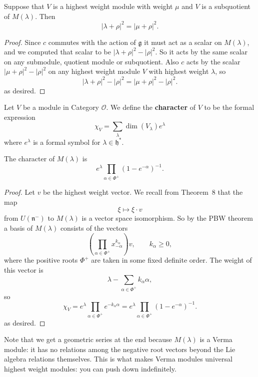 \documentclass[12pt]{article}
\begin{document}
\begin{proposition}
    Suppose that $V$ is a highest weight module with weight $\mu$ and $V$ is a subquotient of $M(\lambda)$. Then
    \[
        |\lambda + \rho|^2 = |\mu + \rho|^2.
    \]
\end{proposition}

\begin{proof}
    Since $c$ commutes with the action of $\mathfrak{g}$ it must act as a scalar on $M(\lambda)$, and we computed that scalar to be $|\lambda + \rho|^2 - |\rho|^2$. So it acts by the same scalar on any submodule, quotient module or subquotient. Also $c$ acts by the scalar $|\mu + \rho|^2 - |\rho|^2$ on any highest weight module $V$ with highest weight $\lambda$, so
    \[
        |\lambda + \rho|^2 - |\rho|^2 = |\mu + \rho|^2 - |\rho|^2.
    \] as desired.
\end{proof}

\begin{definition}
    Let $V$ be a module in Category $\mathcal{O}$. We define the \textbf{character} of $V$ to be the formal expression
    \[
        \chi_V = \sum_{\lambda} \dim(V_\lambda) e^\lambda
    \]
    where $e^\lambda$ is a formal symbol for $\lambda \in \mathfrak{h}^*$.
\end{definition}

\begin{proposition}\label{prop:char-verma}
    The character of $M(\lambda)$ is
    \[
        e^\lambda \prod_{\alpha \in \Phi^+} (1 - e^{-\alpha})^{-1}.
    \]
\end{proposition}

\begin{proof}
    Let $v$ be the highest weight vector. We recall from Theorem~8 that the map
    \[
        \xi \mapsto \xi \cdot v
    \]
    from $U(\mathfrak{n}^-)$ to $M(\lambda)$ is a vector space isomorphism. So by the PBW theorem a basis of $M(\lambda)$ consists of the vectors
    \[
        \left( \prod_{\alpha \in \Phi^+} x_{-\alpha}^{k_\alpha} \right) v, \qquad k_\alpha \geq 0,
    \]
    where the positive roots $\Phi^+$ are taken in some fixed definite order. The weight of this vector is
    \[
        \lambda - \sum_{\alpha \in \Phi^+} k_\alpha \alpha,
    \]
    so
    \[
        \chi_V = e^\lambda \prod_{\alpha \in \Phi^+} e^{-k_\alpha \alpha}
        = e^\lambda \prod_{\alpha \in \Phi^+} (1 - e^{-\alpha})^{-1}.
    \] as desired.
\end{proof}

\begin{remark}
    Note that we get a geometric series at the end because $M(\lambda)$ is a Verma module: it has no relations among the negative root vectors beyond the Lie algebra relations themselves. This is what makes Verma modules universal highest weight modules: you can push down indefinitely.
\end{remark}
\end{document}

